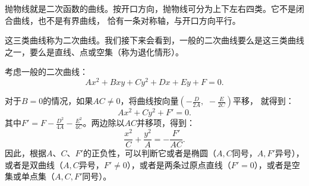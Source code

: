 \documentclass[12pt,UTF8,fontset=none]{ctexbook}
\begin{document}
\begin{figure} %
    \vspace{-8pt}
    \flushleft
\end{figure}

抛物线就是二次函数的曲线。按开口方向，抛物线可分为上下左右四类。它不是闭合曲线，也不是有界曲线，
恰有一条对称轴，与开口方向平行。

这三类曲线称为二次曲线。我们接下来会看到，一般的二次曲线要么是这三类曲线之一，要么是直线、点或空集（称为退化情形）。

考虑一般的二次曲线：
$$ Ax^2 + Bxy + Cy^2 + Dx + Ey + F = 0.$$

对于$B = 0$的情况，如果$AC\neq 0$，将曲线按向量$\displaystyle\left(-\frac{D}{2A},\,\,-\frac{E}{2C}\right)$平移，
就得到：
$$ Ax^2 + Cy^2 + F' = 0.$$
其中$F' = F - \frac{D^2}{4A} - \frac{E^2}{4C}$。两边除以$AC$并移项，得到：
$$ \frac{x^2}{C} + \frac{y^2}{A} = -\frac{F'}{AC}.$$
因此，根据$A$、$C$、$F'$的正负性，可以判断它或者是椭圆（$A,C$同号，$A,F'$异号），
或者是双曲线（$A,C$异号，$F' \neq 0$），或者是两条过原点直线（$F' = 0$），或者是空集或单点集（$A,C,F'$同号）。
\end{document}
